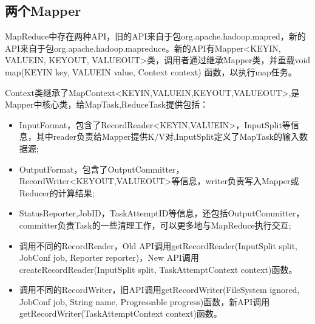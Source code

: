 \subsection{两个Mapper}
\par MapReduce中存在两种API，旧的API来自于包org.apache.hadoop.mapred，新的API来自于包org.apache.hadoop.mapreduce。新的API有Mapper<KEYIN, VALUEIN, KEYOUT, VALUEOUT>类，调用者通过继承Mapper类，并重载void map(KEYIN key, VALUEIN value, Context context) 函数，以执行map任务。
\par Context类继承了MapContext<KEYIN,VALUEIN,KEYOUT,VALUEOUT>,是Mapper中核心类，给MapTask,ReduceTask提供包括：
\begin{itemize}
\item InputFormat，包含了RecordReader<KEYIN,VALUEIN>，InputSplit等信息，其中reader负责给Mapper提供K/V对,InputSplit定义了MapTask的输入数据源;
\item OutputFormat，包含了OutputCommitter，RecordWriter<KEYOUT,VALUEOUT>等信息，writer负责写入Mapper或Reducer的计算结果;
\item StatusReporter,JobID，TaskAttemptID等信息，还包括OutputCommitter，committer负责Task的一些清理工作，可以更多地与MapReduce执行交互;
\item 调用不同的RecordReader，Old API调用getRecordReader(InputSplit split, JobConf job, Reporter reporter)，New API调用createRecordReader(InputSplit split, TaskAttemptContext context)函数。
\item 调用不同的RecordWriter，旧API调用getRecordWriter(FileSystem ignored, JobConf job, String name, Progressable progress)函数，新API调用getRecordWriter(TaskAttemptContext context)函数。
\end{itemize}
